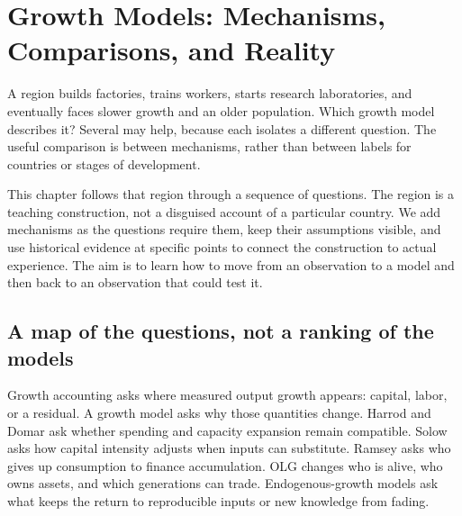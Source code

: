 \section{Growth Models: Mechanisms, Comparisons, and Reality}\label{sec:growth-synthesis}

A region builds factories, trains workers, starts research laboratories, and
eventually faces slower growth and an older population. Which growth model
describes it? Several may help, because each isolates a different question.
The useful comparison is between mechanisms, rather than between labels for
countries or stages of development.

This chapter follows that region through a sequence of questions. The region
is a teaching construction, not a disguised account of a particular country.
We add mechanisms as the questions require them, keep their assumptions
visible, and use historical evidence at specific points to connect the
construction to actual experience. The aim is to learn how to move from an
observation to a model and then back to an observation that could test it.

\subsection{A map of the questions, not a ranking of the models}

Growth accounting asks where measured output growth appears: capital,
labor, or a residual. A growth model asks why those quantities change.
Harrod and Domar ask whether spending and capacity expansion remain
compatible. Solow asks how capital intensity adjusts when inputs can
substitute. Ramsey asks who gives up consumption to finance accumulation.
OLG changes who is alive, who owns assets, and which generations can trade.
Endogenous-growth models ask what keeps the return to reproducible inputs
or new knowledge from fading.

